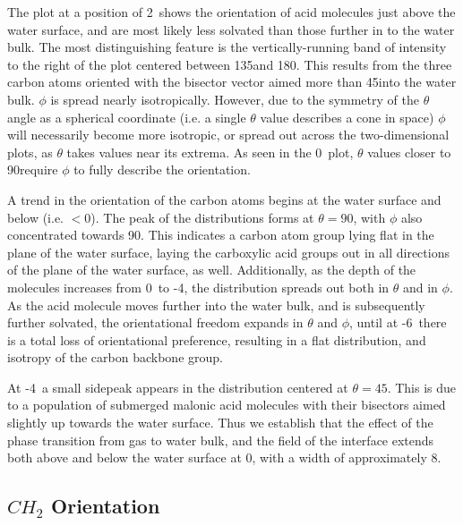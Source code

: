 The plot at a position of 2\angs~shows the orientation of acid molecules just above the water surface, and are most likely less solvated than those further in to the water bulk. The most distinguishing feature is the vertically-running band of intensity to the right of the plot centered between 135\textdegree and 180\textdegree. This results from the three carbon atoms oriented with the bisector vector aimed more than 45\textdegree into the water bulk. $\phi$ is spread nearly isotropically. However, due to the symmetry of the $\theta$ angle as a spherical coordinate (i.e. a single $\theta$ value describes a cone in space) $\phi$ will necessarily become more isotropic, or spread out across the two-dimensional plots, as $\theta$ takes values near its extrema. As seen in the 0\angs~plot, $\theta$ values closer to 90\textdegree require $\phi$ to fully describe the orientation.

A trend in the orientation of the carbon atoms begins at the water surface and below (i.e. $<0$\angs). The peak of the distributions forms at $\theta=90$\textdegree, with $\phi$ also concentrated towards 90\textdegree. This indicates a carbon atom group lying flat in the plane of the water surface, laying the carboxylic acid groups out in all directions of the plane of the water surface, as well. Additionally, as the depth of the molecules increases from 0\angs~to -4\angs, the distribution spreads out both in $\theta$ and in $\phi$. As the acid molecule moves further into the water bulk, and is subsequently further solvated, the orientational freedom expands in $\theta$ and $\phi$, until at -6\angs~there is a total loss of orientational preference, resulting in a flat distribution, and isotropy of the carbon backbone group.

At -4\angs~a small sidepeak appears in the distribution centered at $\theta=45$\textdegree. This is due to a population of submerged malonic acid molecules with their bisectors aimed slightly up towards the water surface. Thus we establish that the effect of the phase transition from gas to water bulk, and the field of the interface extends both above and below the water surface at 0\angs, with a width of approximately 8\angs.



\subsection {$CH_2$ Orientation}

